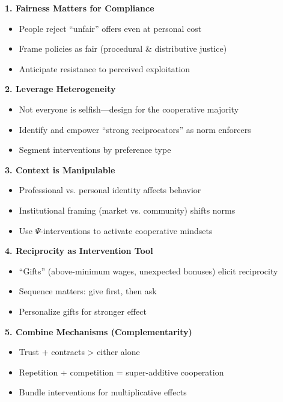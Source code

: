 \begin{tcolorbox}[colback=green!5!white, colframe=green!75!black,
    title=Practical Implications from Fehr's Research]

\textbf{1. Fairness Matters for Compliance}
\begin{itemize}[nosep]
    \item People reject ``unfair'' offers even at personal cost
    \item Frame policies as fair (procedural \& distributive justice)
    \item Anticipate resistance to perceived exploitation
\end{itemize}

\textbf{2. Leverage Heterogeneity}
\begin{itemize}[nosep]
    \item Not everyone is selfish---design for the cooperative majority
    \item Identify and empower ``strong reciprocators'' as norm enforcers
    \item Segment interventions by preference type
\end{itemize}

\textbf{3. Context is Manipulable}
\begin{itemize}[nosep]
    \item Professional vs. personal identity affects behavior
    \item Institutional framing (market vs. community) shifts norms
    \item Use $\Psi$-interventions to activate cooperative mindsets
\end{itemize}

\textbf{4. Reciprocity as Intervention Tool}
\begin{itemize}[nosep]
    \item ``Gifts'' (above-minimum wages, unexpected bonuses) elicit reciprocity
    \item Sequence matters: give first, then ask
    \item Personalize gifts for stronger effect
\end{itemize}

\textbf{5. Combine Mechanisms (Complementarity)}
\begin{itemize}[nosep]
    \item Trust + contracts > either alone
    \item Repetition + competition = super-additive cooperation
    \item Bundle interventions for multiplicative effects
\end{itemize}

\end{tcolorbox}


